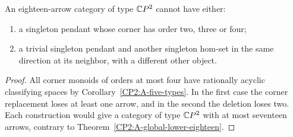 \begin{corollary}
\label{CP2:A-singleton-pendant-eighteen}
An eighteen-arrow category of type $\mathbb{C}P^2$ cannot have either:
\begin{enumerate}
\item a singleton pendant whose corner has order two, three or four;
\item a trivial singleton pendant and another singleton hom-set
in the same direction at its neighbor, with a different other object.
\end{enumerate}
\end{corollary}
\begin{proof}
All corner monoids of orders at most four have rationally acyclic
classifying spaces by Corollary~\ref{CP2:A-five-types}.
In the first case the corner replacement loses at least one
arrow, and in the second the deletion loses two. Each construction
would give a category of type $\mathbb{C}P^2$ with at most seventeen
arrows, contrary to Theorem~\ref{CP2:A-global-lower-eighteen}.
\end{proof}
